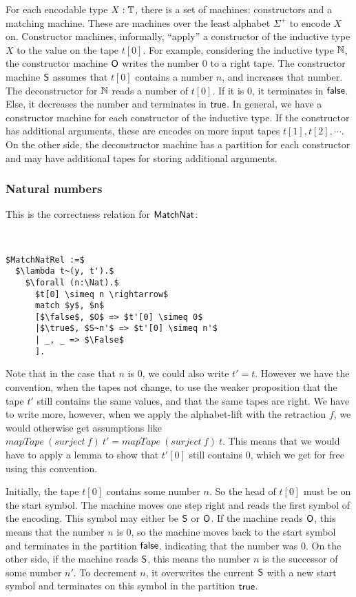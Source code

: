 For each encodable type $X:\mathbb{T}$, there is a set of machines: constructors and a matching machine.  These are machines over the least alphabet
$\Sigma^+$ to encode $X$ on.  Constructor machines, informally, ``apply'' a constructor of the inductive type $X$ to the value on the tape $t[0]$.
For example, considering the inductive type $\mathbb{N}$, the constructor machine $\mathsf{O}$ writes the number $0$ to a right tape.  The constructor machine
$\mathsf{S}$ assumes that $t[0]$ contains a number $n$, and increases that number.  The deconstructor for $\mathbb{N}$ reads a number of $t[0]$.  If it is $0$,
it terminates in $\mathsf{false}$.  Else, it decreases the number and terminates in $\mathsf{true}$.  In general, we have a constructor machine for each constructor
of the inductive type.  If the constructor has additional arguments, these are encodes on more input tapes $t[1], t[2], \cdots$.  On the other side,
the deconstructor machine has a partition for each constructor and may have additional tapes for storing additional arguments.

\subsubsection{Natural numbers}
\label{sec:match-nat}

This is the correctness relation for $\mathsf{MatchNat}$:
\begin{definition}
  \label{def:MatchNat_Rel}
  ~
\begin{lstlisting}[style=semicoqstyle]
$MatchNatRel :=$
  $\lambda t~(y, t').$
    $\forall (n:\Nat).$
      $t[0] \simeq n \rightarrow$
      match $y$, $n$
      [$\false$, $O$ => $t'[0] \simeq 0$
      |$\true$, $S~n'$ => $t'[0] \simeq n'$
      | _, _ => $\False$
      ].
\end{lstlisting}
\end{definition}

Note that in the case that $n$ is $0$, we could also write $t'=t$.  However we have the convention, when the tapes not change, to use the weaker
proposition that the tape $t'$ still contains the same values, and that the same tapes are right.  We have to write more, however, when we apply the
alphabet-lift with the retraction $f$, we would otherwise get assumptions like $mapTape~(surject~f)~t' = mapTape~(surject~f)~t$.  This means that we
would have to apply a lemma to show that $t'[0]$ still contains $0$, which we get for free using this convention.

Initially, the tape $t[0]$ contains some number $n$.  So the head of $t[0]$ must be on the start symbol.  The machine moves one step right and reads
the first symbol of the encoding.  This symbol may either be $\mathsf{S}$ or $\mathsf{O}$.  If the machine reads $\mathsf{O}$, this means that the number $n$ is
$0$, so the machine moves back to the start symbol and terminates in the partition $\mathsf{false}$, indicating that the number was $0$.  On the other side,
if the machine reads $\mathsf{S}$, this means the number $n$ is the successor of some number $n'$.  To decrement $n$, it overwrites the current $\mathsf{S}$
with a new start symbol and terminates on this symbol in the partition $\mathsf{true}$.

